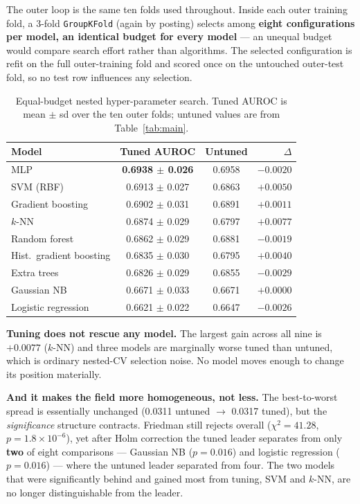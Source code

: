 \documentclass[11pt]{article}                      %
\newcommand{\tabfont}{\footnotesize}
\begin{document}
The outer loop is the same ten folds used throughout. Inside each outer training
fold, a 3-fold \texttt{GroupKFold} (again by posting) selects among \textbf{eight
configurations per model, an identical budget for every model} --- an unequal
budget would compare search effort rather than algorithms. The selected
configuration is refit on the full outer-training fold and scored once on the
untouched outer-test fold, so no test row influences any selection.

\begin{table}[h]
\centering\tabfont
\caption{Equal-budget nested hyper-parameter search. Tuned AUROC is mean $\pm$ sd
over the ten outer folds; untuned values are from Table~\ref{tab:main}.}
\label{tab:tuned}
\begin{tabular}{lccr}
\toprule
Model & Tuned AUROC & Untuned & $\Delta$ \\
\midrule
MLP                      & \textbf{0.6938 $\pm$ 0.026} & 0.6958 & $-0.0020$ \\
SVM (RBF)                & 0.6913 $\pm$ 0.027 & 0.6863 & $+0.0050$ \\
Gradient boosting        & 0.6902 $\pm$ 0.031 & 0.6891 & $+0.0011$ \\
$k$-NN                   & 0.6874 $\pm$ 0.029 & 0.6797 & $\mathbf{+0.0077}$ \\
Random forest            & 0.6862 $\pm$ 0.029 & 0.6881 & $-0.0019$ \\
Hist.\ gradient boosting & 0.6835 $\pm$ 0.030 & 0.6795 & $+0.0040$ \\
Extra trees              & 0.6826 $\pm$ 0.029 & 0.6855 & $-0.0029$ \\
Gaussian NB              & 0.6671 $\pm$ 0.033 & 0.6671 & $+0.0000$ \\
Logistic regression      & 0.6621 $\pm$ 0.022 & 0.6647 & $-0.0026$ \\
\bottomrule
\end{tabular}
\end{table}

\textbf{Tuning does not rescue any model.} The largest gain across all nine is
$+0.0077$ ($k$-NN) and three models are marginally worse tuned than untuned,
which is ordinary nested-CV selection noise. No model moves enough to change its
position materially.

\textbf{And it makes the field more homogeneous, not less.} The best-to-worst
spread is essentially unchanged (0.0311 untuned $\rightarrow$ 0.0317 tuned), but
the \emph{significance} structure contracts. Friedman still rejects overall
($\chi^2 = 41.28$, $p = 1.8 \times 10^{-6}$), yet after Holm correction the tuned
leader separates from only \textbf{two} of eight comparisons --- Gaussian NB
($p = 0.016$) and logistic regression ($p = 0.016$) --- where the untuned leader
separated from four. The two models that were significantly behind and gained
most from tuning, SVM and $k$-NN, are no longer distinguishable from the leader.
\end{document}
